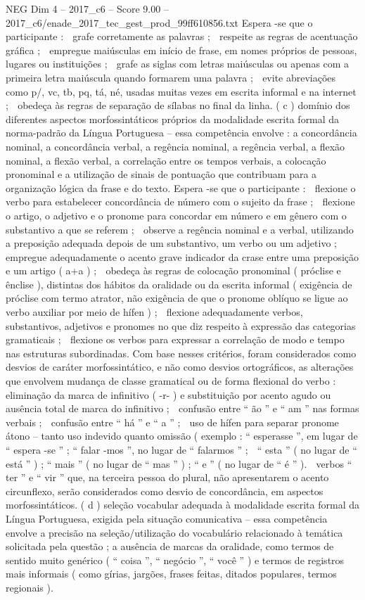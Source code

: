 \begin{textsample}{NEG Dim 4 – 2017\_c6 – Score 9.00 – 2017\_c6/enade\_2017\_tec\_gest\_prod\_99ff610856.txt}
Espera -se que o participante :  grafe corretamente as palavras ;  respeite as regras de acentuação gráfica ;  empregue maiúsculas em início de frase, em nomes próprios de pessoas, lugares ou instituições ;  grafe as siglas com letras maiúsculas ou apenas com a primeira letra maiúscula quando formarem uma palavra ;  evite abreviações como p/, vc, tb, pq, tá, né, usadas muitas vezes em escrita informal e na internet ;  obedeça às regras de separação de sílabas no final da linha. ( c ) domínio dos diferentes aspectos morfossintáticos próprios da modalidade escrita formal da norma-padrão da Língua Portuguesa – essa competência envolve : a concordância nominal, a concordância verbal, a regência nominal, a regência verbal, a flexão nominal, a flexão verbal, a correlação entre os tempos verbais, a colocação pronominal e a utilização de sinais de pontuação que contribuam para a organização lógica da frase e do texto.
Espera -se que o participante :  flexione o verbo para estabelecer concordância de número com o sujeito da frase ;  flexione o artigo, o adjetivo e o pronome para concordar em número e em gênero com o substantivo a que se referem ;  observe a regência nominal e a verbal, utilizando a preposição adequada depois de um substantivo, um verbo ou um adjetivo ;  empregue adequadamente o acento grave indicador da crase entre uma preposição e um artigo ( a+a ) ;  obedeça às regras de colocação pronominal ( próclise e ênclise ), distintas dos hábitos da oralidade ou da escrita informal ( exigência de próclise com termo atrator, não exigência de que o pronome oblíquo se ligue ao verbo auxiliar por meio de hífen ) ;  flexione adequadamente verbos, substantivos, adjetivos e pronomes no que diz respeito à expressão das categorias gramaticais ;  flexione os verbos para expressar a correlação de modo e tempo nas estruturas subordinadas.
Com base nesses critérios, foram considerados como desvios de caráter morfossintático, e não como desvios ortográficos, as alterações que envolvem mudança de classe gramatical ou de forma flexional do verbo :  eliminação da marca de infinitivo ( -r- ) e substituição por acento agudo ou ausência total de marca do infinitivo ;  confusão entre “ ão ” e “ am ” nas formas verbais ;  confusão entre “ há ” e “ a ” ;  uso de hífen para separar pronome átono – tanto uso indevido quanto omissão ( exemplo : “ esperasse ”, em lugar de “ espera -se ” ; “ falar -mos ”, no lugar de “ falarmos ” ;  “ esta ” ( no lugar de “ está ” ) ; “ mais ” ( no lugar de “ mas ” ) ; “ e ” ( no lugar de “ é ” ).  verbos “ ter ” e “ vir ” que, na terceira pessoa do plural, não apresentarem o acento circunflexo, serão considerados como desvio de concordância, em aspectos morfossintáticos. ( d ) seleção vocabular adequada à modalidade escrita formal da Língua Portuguesa, exigida pela situação comunicativa – essa competência envolve a precisão na seleção/utilização do vocabulário relacionado à temática solicitada pela questão ; a ausência de marcas da oralidade, como termos de sentido muito genérico ( “ coisa ”, “ negócio ”, “ você ” ) e termos de registros mais informais ( como gírias, jargões, frases feitas, ditados populares, termos regionais ).

\end{textsample}

